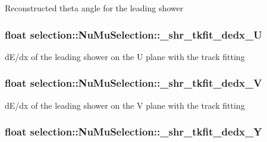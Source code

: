 Reconstructed theta angle for the leading shower \hypertarget{classselection_1_1NuMuSelection_ab7a3a2abb7bf04a5e3d6a190d1c8c415}{
\subsubsection[{\-\_\-shr\-\_\-tkfit\-\_\-dedx\-\_\-\-U}]{\setlength{\rightskip}{0pt plus 5cm}float selection\-::\-Nu\-Mu\-Selection\-::\-\_\-shr\-\_\-tkfit\-\_\-dedx\-\_\-\-U\hspace{0.3cm}{\ttfamily [private]}}}\label{classselection_1_1NuMuSelection_ab7a3a2abb7bf04a5e3d6a190d1c8c415}
d\-E/dx of the leading shower on the U plane with the track fitting \hypertarget{classselection_1_1NuMuSelection_a9a054c559dfa6e536562f2e74d2954e0}{
\subsubsection[{\-\_\-shr\-\_\-tkfit\-\_\-dedx\-\_\-\-V}]{\setlength{\rightskip}{0pt plus 5cm}float selection\-::\-Nu\-Mu\-Selection\-::\-\_\-shr\-\_\-tkfit\-\_\-dedx\-\_\-\-V\hspace{0.3cm}{\ttfamily [private]}}}\label{classselection_1_1NuMuSelection_a9a054c559dfa6e536562f2e74d2954e0}
d\-E/dx of the leading shower on the V plane with the track fitting \hypertarget{classselection_1_1NuMuSelection_a1a04003daefae9bb8088709dae0705ca}{
\subsubsection[{\-\_\-shr\-\_\-tkfit\-\_\-dedx\-\_\-\-Y}]{\setlength{\rightskip}{0pt plus 5cm}float selection\-::\-Nu\-Mu\-Selection\-::\-\_\-shr\-\_\-tkfit\-\_\-dedx\-\_\-\-Y\hspace{0.3cm}{\ttfamily [private]}}}\label{classselection_1_1NuMuSelection_a1a04003daefae9bb8088709dae0705ca}
